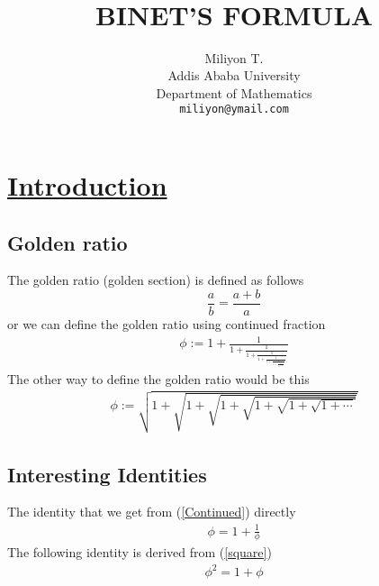 \documentclass[paper=a4, fontsize=11pt,twoside]{scrartcl}		%
\title{	\normalsize \textsc{} 	%
		 	\\[2.0cm]													%
			\HRule{0.5pt} \\										%
			\LARGE \textbf{\uppercase{Binet's Formula}}	%
			\HRule{2pt} \\ [0.5cm]								%
			\normalsize \day{October 7, 2014}									%
		}
\author{
		Miliyon T.\\	
		Addis Ababa University\\	
		Department of Mathematics\\
        \texttt{miliyon@ymail.com} \\
}
\makeatletter
\theoremstyle{definition}
\theoremstyle{remark}
\def\printtitle{%
    {\centering \@title\par}}
\def\printauthor{%
    {\centering \large \@author}}
\makeatother
\begin{document}
\thispagestyle{empty}				%

\printtitle									%
  	\vfill
\printauthor								%
\newpage
\tableofcontents
\section{\href{www.albohessab.weebly.com}{Introduction}}

\subsection{Golden ratio}
The golden ratio (golden section) is defined as follows
$$\frac{a}{b}=\frac{a+b}{a}$$
or we can define the golden ratio using continued fraction
\begin{align}\label{Continued}
\phi:=1+\frac{1}{1+\frac{1}{1+\frac{1}{1+\frac{1}{1+\frac{1}{1+\frac{1}{1+\frac{1}{\ddots}}}}}}}
\end{align}
The other way to define the golden ratio would be this
\begin{align}\label{square}
\phi:=\sqrt{1+\sqrt{1+\sqrt{1+\sqrt{1+\sqrt{1+\sqrt{1+\cdots}}}}}}
\end{align}
\subsection{Interesting Identities}
The identity that we get from (\ref{Continued}) directly
\begin{align}\label{id1}
\phi=1+\frac{1}{\phi}
\end{align}
The following identity is derived from (\ref{square})
\begin{align}\label{id2}
\phi^2=1+\phi
\end{align}
\end{document}
